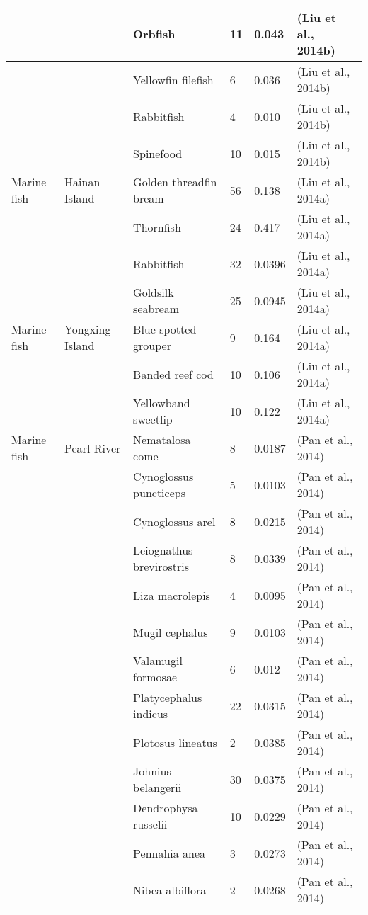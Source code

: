 \begin{center}
\begin{longtable}{ | p{2cm} | p{1.4cm} | p{3cm} | p{1.6cm} | p{1.9cm} | p{2.6cm} | }
 &  & Orbfish & 11 & 0.043  & (Liu et al., 2014b)  \\ \hline
 &  & Yellowfin filefish & 6 & 0.036  & (Liu et al., 2014b)  \\ \hline
 &  & Rabbitfish & 4 & 0.010  & (Liu et al., 2014b)  \\ \hline
 &  & Spinefood & 10 & 0.015  & (Liu et al., 2014b)  \\ \hline
Marine fish & Hainan Island & Golden threadfin bream & 56 & 0.138 & (Liu et al., 2014a)  \\ \hline
 &  & Thornfish & 24 & 0.417  & (Liu et al., 2014a)  \\ \hline
 &  & Rabbitfish & 32 & 0.0396  & (Liu et al., 2014a)  \\ \hline
 &  & Goldsilk seabream & 25 & 0.0945  & (Liu et al., 2014a)  \\ \hline
Marine fish & Yongxing Island & Blue spotted grouper & 9 & 0.164  & (Liu et al., 2014a)  \\ \hline
 &  & Banded reef cod & 10 & 0.106  & (Liu et al., 2014a)  \\ \hline
 &  & Yellowband sweetlip & 10 & 0.122  & (Liu et al., 2014a)  \\ \hline
Marine fish & Pearl River  & Nematalosa come & 8 & 0.0187  & (Pan et al., 2014)  \\ \hline
 &  & Cynoglossus puncticeps & 5 & 0.0103  & (Pan et al., 2014)  \\ \hline
 &  & Cynoglossus arel & 8 & 0.0215  & (Pan et al., 2014)  \\ \hline
 &  & Leiognathus brevirostris & 8 & 0.0339  & (Pan et al., 2014)  \\ \hline
 &  & Liza macrolepis & 4 & 0.0095  & (Pan et al., 2014)  \\ \hline
 &  & Mugil cephalus & 9 & 0.0103  & (Pan et al., 2014)  \\ \hline
 &  & Valamugil formosae & 6 & 0.012  & (Pan et al., 2014)  \\ \hline
 &  & Platycephalus indicus & 22 & 0.0315  & (Pan et al., 2014)  \\ \hline
 &  & Plotosus lineatus & 2 & 0.0385  & (Pan et al., 2014)  \\ \hline
 &  & Johnius belangerii & 30 & 0.0375  & (Pan et al., 2014)  \\ \hline
 &  & Dendrophysa russelii & 10 & 0.0229  & (Pan et al., 2014)  \\ \hline
 &  & Pennahia anea & 3 & 0.0273  & (Pan et al., 2014)  \\ \hline
 &  & Nibea albiflora & 2 & 0.0268  & (Pan et al., 2014)  \\ \hline

\end{longtable}
\end{center}
